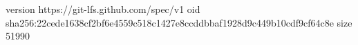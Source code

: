 version https://git-lfs.github.com/spec/v1
oid sha256:22cede1638cf2bf6e4559c518c1427e8ccddbbaf1928d9c449b10cdf9cf64c8e
size 51990
